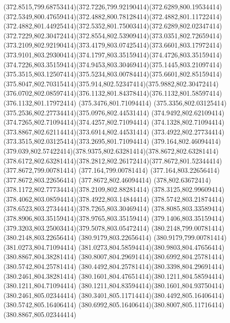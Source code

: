 {{	\curveto(372.8515,799.68753414)(372.7226,799.92190414)(372.6289,800.19534414)
	\curveto(372.5349,800.47659414)(372.4882,800.78128414)(372.4882,801.11722414)
	\curveto(372.4882,801.44925414)(372.5352,801.75003414)(372.6289,802.02347414)
	\curveto(372.7229,802.30472414)(372.8554,802.53909414)(373.0351,802.72659414)
	\curveto(373.2109,802.92190414)(373.4179,803.07425414)(373.6601,803.17972414)
	\curveto(373.9101,803.29300414)(374.1797,803.35159414)(374.4726,803.35159414)
	\curveto(374.7226,803.35159414)(374.9453,803.30469414)(375.1445,803.21097414)
	\curveto(375.3515,803.12507414)(375.5234,803.00784414)(375.6601,802.85159414)
	\curveto(375.8047,802.70315414)(375.914,802.52347414)(375.9882,802.30472414)
	\curveto(376.0702,802.08597414)(376.1132,801.84378414)(376.1132,801.58597414)
	\lineto(376.1132,801.17972414)
	\closepath
	\moveto(375.3476,801.71094414)
	\curveto(375.3356,802.03125414)(375.2536,802.27734414)(375.0976,802.44531414)
	\curveto(374.9492,802.62109414)(374.7265,802.71094414)(374.4257,802.71094414)
	\curveto(374.1328,802.71094414)(373.8867,802.62114414)(373.6914,802.44531414)
	\curveto(373.4922,802.27734414)(373.3515,802.03125414)(373.2695,801.71094414)
	\closepath
	\moveto(379.164,802.46094414)
	\curveto(379.039,802.57422414)(378.9375,802.63281414)(378.8672,802.63281414)
	\curveto(378.6172,802.63281414)(378.2812,802.26172414)(377.8672,801.52344414)
	\lineto(377.8672,799.00781414)
	\lineto(377.164,799.00781414)
	\lineto(377.164,803.22656414)
	\lineto(377.8672,803.22656414)
	\lineto(377.8672,802.46094414)
	\curveto(378,802.63672414)(378.1172,802.77734414)(378.2109,802.88281414)
	\curveto(378.3125,802.99609414)(378.4062,803.08594414)(378.4922,803.14844414)
	\curveto(378.5742,803.21874414)(378.6523,803.27344414)(378.7265,803.30469414)
	\curveto(378.8085,803.33589414)(378.8906,803.35159414)(378.9765,803.35159414)
	\curveto(379.1406,803.35159414)(379.3203,803.25003414)(379.5078,803.05472414)
	\closepath
	\moveto(380.2148,799.00781414)
	\lineto(380.2148,803.22656414)
	\lineto(380.9179,803.22656414)
	\lineto(380.9179,799.00781414)
	\closepath
	\moveto(381.0273,804.71094414)
	\curveto(381.0273,804.58594414)(380.9803,804.47656414)(380.8867,804.38281414)
	\curveto(380.8007,804.29691414)(380.6992,804.25781414)(380.5742,804.25781414)
	\curveto(380.4492,804.25781414)(380.3398,804.29691414)(380.2461,804.38281414)
	\curveto(380.1601,804.47651414)(380.1211,804.58594414)(380.1211,804.71094414)
	\curveto(380.1211,804.83594414)(380.1601,804.93750414)(380.2461,805.02344414)
	\curveto(380.3401,805.11714414)(380.4492,805.16406414)(380.5742,805.16406414)
	\curveto(380.6992,805.16406414)(380.8007,805.11716414)(380.8867,805.02344414)
}}
